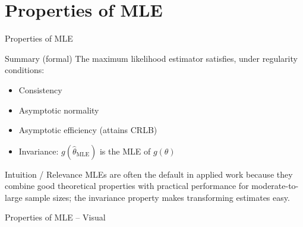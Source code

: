 \section{Properties of MLE}

\begin{frame}{Properties of MLE}
  \begin{block}{Summary (formal)}
    The maximum likelihood estimator satisfies, under regularity conditions:
    \begin{itemize}
      \item Consistency
      \item Asymptotic normality
      \item Asymptotic efficiency (attains CRLB)
      \item Invariance: $g(\hat{\theta}_{\text{MLE}})$ is the MLE of $g(\theta)$
    \end{itemize}
  \end{block}

  \begin{block}{Intuition / Relevance}
    MLEs are often the default in applied work because they combine good
    theoretical properties with practical performance for moderate-to-large
    sample sizes; the invariance property makes transforming estimates easy.
  \end{block}

  \vspace{0.7em}
\end{frame}

\begin{frame}{Properties of MLE -- Visual}
  \begin{center}
    \begin{adjustbox}{max height=0.40\textheight}
    \end{adjustbox}
  \end{center}
\end{frame}